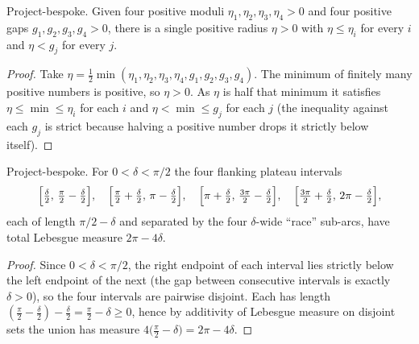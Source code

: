 \begin{lemma}
  \label{lem:exists_plateau_radius}
  Project-bespoke. Given four positive moduli $\eta_1,\eta_2,\eta_3,\eta_4>0$ and
  four positive gaps $g_1,g_2,g_3,g_4>0$, there is a single positive radius
  $\eta>0$ with $\eta\le\eta_i$ for every $i$ and $\eta<g_j$ for every $j$.
\end{lemma}
\begin{proof}

\leanok
  Take $\eta=\tfrac12\min(\eta_1,\eta_2,\eta_3,\eta_4,g_1,g_2,g_3,g_4)$. The
  minimum of finitely many positive numbers is positive, so $\eta>0$. As $\eta$
  is half that minimum it satisfies $\eta\le\min\le\eta_i$ for each $i$ and
  $\eta<\min\le g_j$ for each $j$ (the inequality against each $g_j$ is strict
  because halving a positive number drops it strictly below itself).
\end{proof}

\begin{lemma}
  \label{lem:plateau_union_measure}
  Project-bespoke. For $0<\delta<\pi/2$ the four flanking plateau intervals
  \[
    \Bigl[\tfrac{\delta}{2},\,\tfrac{\pi}{2}-\tfrac{\delta}{2}\Bigr],\quad
    \Bigl[\tfrac{\pi}{2}+\tfrac{\delta}{2},\,\pi-\tfrac{\delta}{2}\Bigr],\quad
    \Bigl[\pi+\tfrac{\delta}{2},\,\tfrac{3\pi}{2}-\tfrac{\delta}{2}\Bigr],\quad
    \Bigl[\tfrac{3\pi}{2}+\tfrac{\delta}{2},\,2\pi-\tfrac{\delta}{2}\Bigr],
  \]
  each of length $\pi/2-\delta$ and separated by the four $\delta$-wide ``race''
  sub-arcs, have total Lebesgue measure $2\pi-4\delta$.
\end{lemma}
\begin{proof}

\leanok
  Since $0<\delta<\pi/2$, the right endpoint of each interval lies strictly below
  the left endpoint of the next (the gap between consecutive intervals is exactly
  $\delta>0$), so the four intervals are pairwise disjoint. Each has length
  $(\tfrac{\pi}{2}-\tfrac{\delta}{2})-\tfrac{\delta}{2}=\tfrac{\pi}{2}-\delta\ge0$,
  hence by additivity of Lebesgue measure on disjoint sets the union has measure
  $4\bigl(\tfrac{\pi}{2}-\delta\bigr)=2\pi-4\delta$.
\end{proof}

